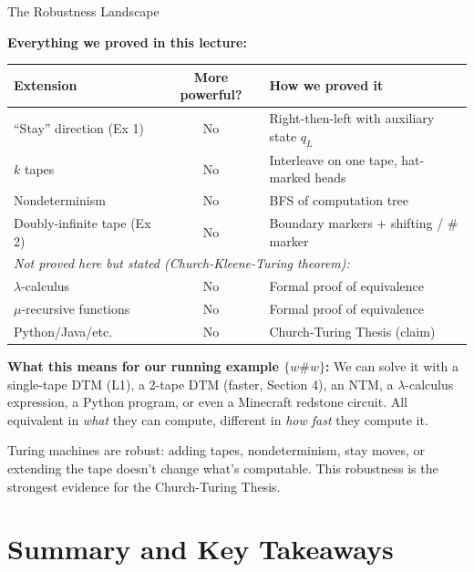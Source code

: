 \documentclass[11pt,a4paper]{article}
\newcommand{\kt}[1]{\par\vspace{0.3em}\colorbox{yellow!60}{\parbox{\dimexpr\linewidth-2\fboxsep}{#1}}\vspace{0.3em}}
\begin{document}
\begin{conceptbox}{The Robustness Landscape}

\textbf{Everything we proved in this lecture:}

\begin{center}
\renewcommand{\arraystretch}{1.4}
\begin{tabular}{lcp{6cm}}
\toprule
\textbf{Extension} & \textbf{More powerful?} & \textbf{How we proved it} \\
\midrule
``Stay'' direction (Ex 1) & No & Right-then-left with auxiliary state $q_L$ \\
$k$ tapes & No & Interleave on one tape, hat-marked heads \\
Nondeterminism & No & BFS of computation tree \\
Doubly-infinite tape (Ex 2) & No & Boundary markers + shifting / $\#$ marker \\
\midrule
\multicolumn{3}{l}{\textit{Not proved here but stated (Church-Kleene-Turing theorem):}} \\
$\lambda$-calculus & No & Formal proof of equivalence \\
$\mu$-recursive functions & No & Formal proof of equivalence \\
Python/Java/etc. & No & Church-Turing Thesis (claim) \\
\bottomrule
\end{tabular}
\end{center}

\textbf{What this means for our running example $\{w\#w\}$:} We can solve it with a single-tape DTM (L1), a 2-tape DTM (faster, Section 4), an NTM, a $\lambda$-calculus expression, a Python program, or even a Minecraft redstone circuit. All equivalent in \textit{what} they can compute, different in \textit{how fast} they compute it.

\kt{Turing machines are robust: adding tapes, nondeterminism, stay moves, or extending the tape doesn't change what's computable. This robustness is the strongest evidence for the Church-Turing Thesis.}
\end{conceptbox}


\newpage
\section{Summary and Key Takeaways}
\end{document}
